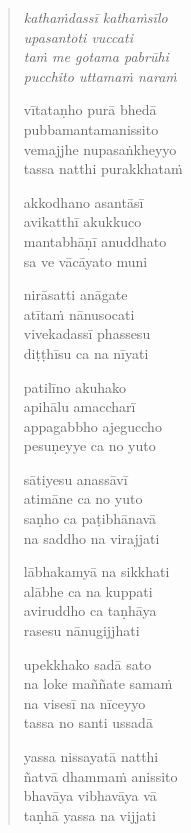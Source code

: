 

\cleartoverso

\vspace*{30mm}

\begin{verse}

\emph{kathaṁdassī kathaṁsīlo\\
upasantoti vuccati}\\
\emph{taṁ me gotama pabrūhi\\
pucchito uttamaṁ naraṁ}

vītataṇho purā bhedā\\
pubbamantamanissito\\
vemajjhe nupasaṅkheyyo\\
tassa natthi purakkhataṁ

akkodhano asantāsī\\
avikatthī akukkuco\\
mantabhāṇī anuddhato\\
sa ve vācāyato muni

nirāsatti anāgate\\
atītaṁ nānusocati\\
vivekadassī phassesu\\
diṭṭhīsu ca na nīyati

patilīno akuhako\\
apihālu amaccharī\\
appagabbho ajeguccho\\
pesuṇeyye ca no yuto

sātiyesu anassāvī\\
atimāne ca no yuto\\
saṇho ca paṭibhānavā\\
na saddho na virajjati

lābhakamyā na sikkhati\\
alābhe ca na kuppati\\
aviruddho ca taṇhāya\\
rasesu nānugijjhati

upekkhako sadā sato\\
na loke maññate samaṁ\\
na visesī na nīceyyo\\
tassa no santi ussadā

yassa nissayatā natthi\\
ñatvā dhammaṁ anissito\\
bhavāya vibhavāya vā\\
taṇhā yassa na vijjati


\end{verse}
